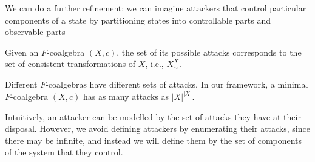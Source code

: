 We can do a further refinement: we can imagine attackers that control particular components of a state by partitioning states into controllable parts and observable parts

\begin{definition}[Attack]
Given an $F$-coalgebra $(X,c)$, the set of its possible attacks corresponds to the set of consistent transformations of $X$, i.e., $X^X_\sim$. 
\end{definition}
Different $F$-coalgebras have different sets of attacks. In our framework, a minimal $F$-coalgebra $(X,c)$ has as many attacks as $|X|^{|X|}$.

Intuitively, an attacker can be modelled by the set of attacks they have at their disposal. However, we avoid defining attackers by enumerating their attacks, since there may be infinite, and instead we will define them by the set of components of the system that they control. 


